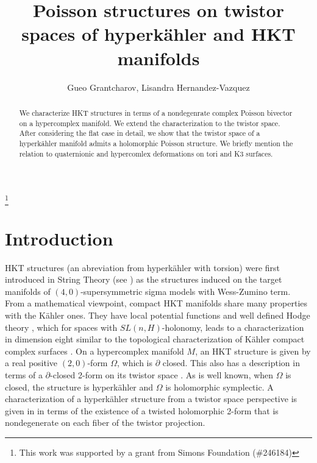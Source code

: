 \documentclass[11pt,oneside,leqno]{amsart}
\theoremstyle{plain}
\theoremstyle{definition}
\begin{document}
\title[Poisson structures]{Poisson structures on twistor spaces of hyperk\"ahler and HKT manifolds}
\author{Gueo Grantcharov,  Lisandra Hernandez-Vazquez}
\address{Department of Mathematics and Statistics\\
Florida International University\\
11200 S.W. 8th Street\\
Miami, Florida 33199\\
USA
}
\thanks{This work was supported by a grant from Simons Foundation (\#246184)}
\begin{abstract}
We characterize HKT structures in terms of a nondegenrate complex Poisson
 bivector on a hypercomplex manifold. We extend the characterization to the twistor space. After considering the flat case in detail, we show that the twistor space of a hyperk\"ahler manifold admits a holomorphic Poisson structure. We briefly mention the relation to quaternionic and hypercomlex deformations on tori and K3 surfaces.
\end{abstract}
\maketitle
\vspace{.2in}

\section{Introduction}

HKT structures (an abreviation from hyperk\"ahler with torsion) were first introduced in String Theory (see \cite{HP}) as the structures induced on the target manifolds of $(4,0)$-supersymmetric sigma models with Wess-Zumino term. From a mathematical viewpoint, compact HKT manifolds share many properties with the K\"ahler ones. They have local potential functions \cite{BS, GP} and well defined Hodge theory \cite{V}, which for spaces with $SL(n, H)$-holonomy, leads to a characterization in dimension eight similar to the topological characterization of K\"ahler compact complex surfaces \cite{GLV}. On a hypercomplex manifold $M$, an HKT structure is given by a real positive $(2,0)$-form $\Omega$, which is $\partial$ closed. This also has a description in terms of a $\partial$-closed 2-form on its twistor space \cite{BS, GP}. As is well known, when $\Omega$ is closed, the structure is  hyperk\"ahler and $\Omega$ is holomorphic symplectic. A characterization of a hyperk\"ahler structure from a twistor space perspective is given in \cite{HKLR} in terms of the existence of a twisted holomorphic 2-form that is nondegenerate on each fiber of the twistor projection.
\end{document}
